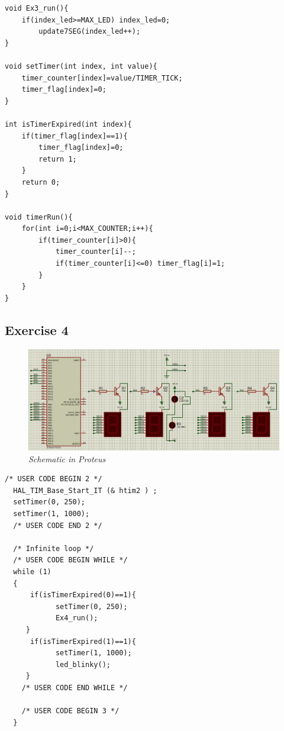 \begin{lstlisting}[caption=software$\_$timer3.c]
void Ex3_run(){
	if(index_led>=MAX_LED) index_led=0;
		update7SEG(index_led++);
}

void setTimer(int index, int value){
	timer_counter[index]=value/TIMER_TICK;
	timer_flag[index]=0;
}

int isTimerExpired(int index){
	if(timer_flag[index]==1){
		timer_flag[index]=0;
		return 1;
	}
	return 0;
}

void timerRun(){
	for(int i=0;i<MAX_COUNTER;i++){
		if(timer_counter[i]>0){
			timer_counter[i]--;
			if(timer_counter[i]<=0) timer_flag[i]=1;
		}
	}
}
\end{lstlisting}
\subsection{Exercise 4}
\begin{figure}[!htp]
    \centering
    \includegraphics[width=5.5in]{source/picture/bai_2/pic4.jpg}
    \caption{\textit{ Schematic in Proteus}}
    \label{bai2_pic1a}
\end{figure}
\begin{lstlisting}[caption=main.c]
/* USER CODE BEGIN 2 */
  HAL_TIM_Base_Start_IT (& htim2 ) ;
  setTimer(0, 250);
  setTimer(1, 1000);
  /* USER CODE END 2 */

  /* Infinite loop */
  /* USER CODE BEGIN WHILE */
  while (1)
  {
	  if(isTimerExpired(0)==1){
	 	  	setTimer(0, 250);
	 	  	Ex4_run();
	 }
	  if(isTimerExpired(1)==1){
	 	  	setTimer(1, 1000);
	 	  	led_blinky();
	 }
    /* USER CODE END WHILE */

    /* USER CODE BEGIN 3 */
  }
\end{lstlisting}
